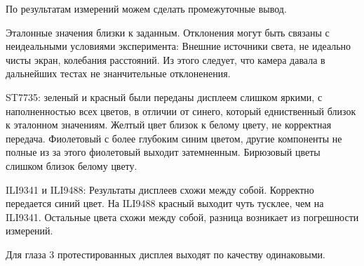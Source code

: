 	По результатам измерений можем сделать промежуточные вывод.
	
	Эталонные значения близки к заданным. Отклонения могут быть связаны с неидеальными условиями эксперимента: Внешние источники света, не идеально чисты экран, колебания расстояний. Из этого следует, что камера давала в дальнейших тестах не знанчительные отклоненения.
	
	ST7735: зеленый и красный были переданы дисплеем слишком яркими, с наполненностью всех цветов, в отличии от синего, который едниственный близок к эталонном значениям. Желтый цвет близок к белому цвету, не корректная передача. Фиолетовый с более глубоким синим цветом, другие компоненты не полные из за этого фиолетовый выходит затемненным. Бирюзовый цветы слишком близок белому цвету.

	ILI9341 и ILI9488: Результаты дисплеев схожи между собой. Корректно передается синий цвет. На ILI9488 красный выходит чуть тусклее, чем на ILI9341. Остальные цвета схожи между собой, разница возникает из погрешности измерений.
	
	Для глаза 3 протестированных дисплея выходят по качеству одинаковыми.

	
	
	
	
	
	
	
